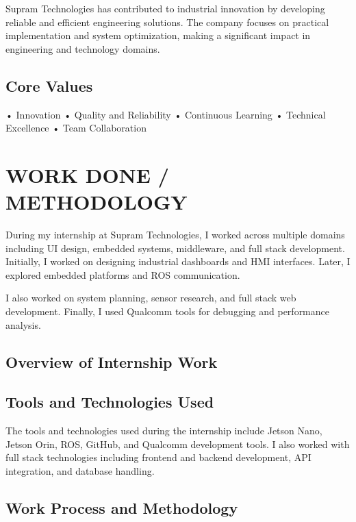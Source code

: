 \documentclass[12pt,a4paper]{report}
\begin{document}
Supram Technologies has contributed to industrial innovation by developing reliable and efficient engineering solutions. The company focuses on practical implementation and system optimization, making a significant impact in engineering and technology domains.


\section{Core Values}

• Innovation • Quality and Reliability • Continuous Learning • Technical Excellence • Team Collaboration




\chapter{WORK DONE / METHODOLOGY}
\label{ch:work}


During my internship at Supram Technologies, I worked across multiple domains including UI design, embedded systems, middleware, and full stack development. Initially, I worked on designing industrial dashboards and HMI interfaces. Later, I explored embedded platforms and ROS communication.


I also worked on system planning, sensor research, and full stack web development. Finally, I used Qualcomm tools for debugging and performance analysis.


\section{Overview of Internship Work}


\section{Tools and Technologies Used}

The tools and technologies used during the internship include Jetson Nano, Jetson Orin, ROS, GitHub, and Qualcomm development tools. I also worked with full stack technologies including frontend and backend development, API integration, and database handling.




\section{Work Process and Methodology}
\end{document}
